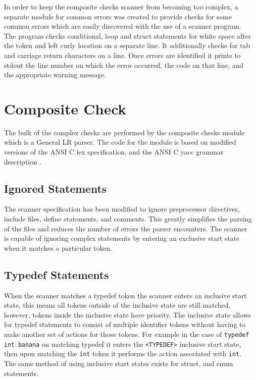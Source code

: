 In order to keep the composite checks scanner from becoming too complex, a 
separate module for common errors was created to provide checks for some common
errors which are easily discovered with the use of a scanner program. The 
program checks conditional, loop and struct statements for white space after 
the token and left curly location on a separate line. It additionally checks for 
tab and carriage return characters on a line. Once errors are identified it 
prints to stdout the line number on which the error occurred, the code on that 
line, and the appropriate warning message.


\section{Composite Check}

The bulk of the complex checks are performed by the composite checks module 
which is a General LR parser. The code for the module is based on modified 
versions of the ANSI C lex specification, and the ANSI C yacc grammar 
description \citep{ANSI}.

\subsection{Ignored Statements}
The scanner specification has been modified to 
ignore preprocessor directives, include files, define statements, and comments.
This greatly simplifies the parsing of the files and reduces the number of 
errors the parser encounters. The scanner is capable of ignoring complex 
statements by entering an exclusive start state when it matches a particular
token.

\subsection{Typedef Statements}
When the scanner matches a typedef token the scanner enters an inclusive start
state, this means all tokens outside of the inclusive state are still matched,
however, tokens inside the inclusive state have priority. The inclusive state 
allows for typedef statements to consist of multiple identifier tokens without 
having to make another set of actions for those tokens. For example in the case
of \texttt{typedef int banana} on matching typedef it enters the 
\verb|<TYPEDEF>| inclusive start state, then upon matching the \texttt{int} 
token it performs the action associated with \texttt{int}. The same method of 
using inclusive start states exists for struct, and enum statements.

